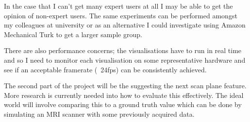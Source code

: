 \documentclass[
  oneside,
  11pt, a4paper,
  footinclude=true,
  headinclude=true,
  cleardoublepage=empty
]{scrbook}
\begin{document}
In the case that I can't get many expert users at all I may be able to get the opinion of non-expert users. The same experiments can be performed amongst my colleagues at university or as an alternative I could investigate using Amazon Mechanical Turk to get a larger sample group.

There are also performance concerns; the visualisations have to run in real time and so I need to monitor each visualisation on some representative hardware and see if an acceptable framerate (~24fps) can be consistently achieved.

The second part of the project will be the suggesting the next scan plane feature. More research is currently needed into how to evaluate this effectively. The ideal world will involve comparing this to a ground truth value which can be done by simulating an MRI scanner with some previously acquired data.


 

    
\end{document}
